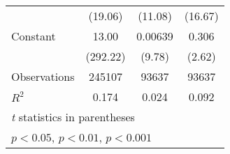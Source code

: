 {\begin{tabular}{l*{3}{c}}
                    &     (19.06)         &     (11.08)         &     (16.67)         \\
[1em]
Constant            &       13.00\sym{***}&     0.00639\sym{***}&       0.306\sym{**} \\
                    &    (292.22)         &      (9.78)         &      (2.62)         \\
\hline
Observations        &      245107         &       93637         &       93637         \\
\(R^{2}\)           &       0.174         &       0.024         &       0.092         \\
\hline\hline
\multicolumn{4}{l}{\footnotesize \textit{t} statistics in parentheses}\\
\multicolumn{4}{l}{\footnotesize \sym{*} \(p<0.05\), \sym{**} \(p<0.01\), \sym{***} \(p<0.001\)}\\
\end{tabular}
}
